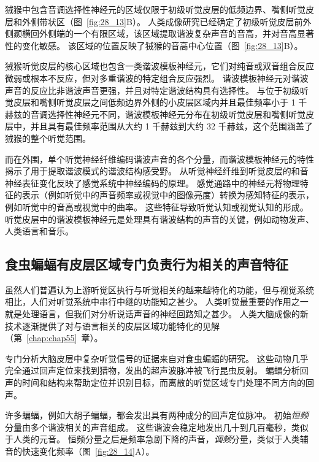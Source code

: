 狨猴中包含音调选择性神经元的区域仅限于初级听觉皮层的低频边界、嘴侧听觉皮层和外侧带状区（图~\ref{fig:28_13}B）。
人类成像研究已经确定了初级听觉皮层前外侧颞横回外侧端的一个有限区域，该区域提取谐波复杂声音的音高，并对音高显著性的变化敏感。
该区域的位置反映了狨猴的音高中心位置（图~\ref{fig:28_13}B）。


狨猴听觉皮层的核心区域也包含一类谐波模板神经元，它们对纯音或双音组合反应微弱或根本不反应，但对多重谐波的特定组合反应强烈。
谐波模板神经元对谐波声音的反应比非谐波声音更强，并且对特定谐波结构具有选择性。
与位于初级听觉皮层和嘴侧听觉皮层之间低频边界外侧的小皮层区域内并且最佳频率小于 1 千赫兹的音调选择性神经元不同，谐波模板神经元分布在初级听觉皮层和嘴侧听觉皮层中，并且具有最佳频率范围从大约 1 千赫兹到大约 32 千赫兹，这个范围涵盖了狨猴的整个听觉范围。


而在外围，单个听觉神经纤维编码谐波声音的各个分量，而谐波模板神经元的特性揭示了用于提取谐波模式的谐波结构感受野。
从听觉神经纤维到听觉皮层的和音神经表征变化反映了感觉系统中神经编码的原理。
感觉通路中的神经元将物理特征的表示（例如听觉中的声音频率或视觉中的图像亮度）转换为感知特征的表示，例如听觉中的音高或视觉中的曲率。
这些特征导致听觉认知或视觉认知的形成。
听觉皮层中的谐波模板神经元是处理具有谐波结构的声音的关键，例如动物发声、人类语言和音乐。



\subsection{食虫蝙蝠有皮层区域专门负责行为相关的声音特征}

虽然人们普遍认为上游听觉区执行与听觉相关的越来越特化的功能，但与视觉系统相比，人们对听觉系统中串行中继的功能知之甚少。
人类听觉最重要的作用之一就是处理语言，但我们对分析说话声音的神经回路知之甚少。
人类大脑成像的新技术逐渐提供了对与语言相关的皮层区域功能特化的见解（第~\ref{chap:chap55}~章）。


专门分析大脑皮层中复杂听觉信号的证据来自对食虫蝙蝠的研究。
这些动物几乎完全通过回声定位来找到猎物，发出的超声波脉冲被飞行昆虫反射。
蝙蝠分析回声的时间和结构来帮助定位并识别目标，而离散的听觉区域专门处理不同方向的回声。


许多蝙蝠，例如大胡子蝙蝠，都会发出具有两种成分的回声定位脉冲\cite{suga1983specificity,suga1984neural}。
初始\emph{恒频}分量由多个谐波相关的声音组成。 %
这些谐波会稳定地发出几十到几百毫秒，类似于人类的元音。
恒频分量之后是频率急剧下降的声音，\textit{调频}分量，类似于人类辅音的快速变化频率（图~\ref{fig:28_14}A）。


